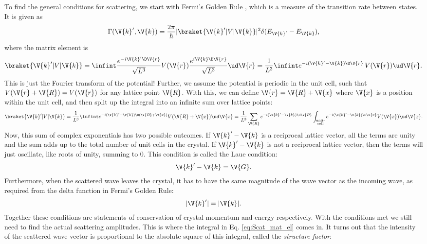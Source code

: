 \documentclass[main.tex]{subfiles}
\begin{document}
	To find the general conditions for scattering, we start with Fermi's Golden Rule \cite{simon}, which is a measure of the transition rate between states. It is given as
	\begin{equation}\label{eq:Scat_fermi}
		\Gamma(\V{k}', \V{k}) = \frac{2\pi}{\hbar}|\braket{\V{k}' | V | \V{k}}|^2 \delta(E_{\V{k}'}-E_{\V{k}}),
	\end{equation}
	where the matrix element is
	\begin{equation}\label{eq:Scat_mat_el_initial}
		\braket{\V{k}' | V | \V{k}} = \infint \frac{e^{-i \V{k}'\D\V{r}}}{\sqrt{L^3}} V(\V{r}) \frac{e^{i \V{k}\D\V{r}}}{\sqrt{L^3}} \ud \V{r} = \frac{1}{L^3} \infint e^{-i(\V{k}'-\V{k}) \D \V{r}} \, V(\V{r}) \ud \V{r}.
	\end{equation}
	This is just the Fourier transform of the potential! Further, we assume the potential is periodic in the unit cell, such that $ V(\V{r} + \V{R}) =  V(\V{r}) $ for any lattice point $ \V{R} $. With this, we can define $ \V{r} = \V{R} + \V{x} $ where $ \V{x} $ is a position within the unit cell, and then split up the integral into an infinite sum over lattice points:
	\begin{equation}\label{eq:Scat_mat_el}
		\braket{\V{k}' | V | \V{k}} = \frac{1}{L^3}\infint e^{-i(\V{k}'-\V{k})\D(\V{R}+\V{x})} V(\V{R}+ \V{x}) \ud \V{x} = \frac{1}{L^3} \sum_{\V{R}} e^{-i(\V{k}'-\V{k}) \D \V{R}}\int_{\substack{\text{unit-} \\\text{cell}}} e^{-i (\V{k}'-\V{k}) \D \V{x}} V(\V{x}) \ud \V{x}.
	\end{equation}
	Now, this sum of complex exponentials has two possible outcomes. If $ \V{k}'-\V{k} $ is a reciprocal lattice vector, all the terms are unity and the sum adds up to the total number of unit cells in the crystal. If $ \V{k}'-\V{k} $ is not a reciprocal lattice vector, then the terms will just oscillate, like roots of unity, summing to 0. This condition is called the Laue condition:
	\begin{equation}\label{eq:Scat_Laue}
		\V{k}' - \V{k} =  \V{G}.
	\end{equation}
	Furthermore, when the scattered wave leaves the crystal, it has to have the same magnitude of the wave vector as the incoming wave, as required from the delta function in Fermi's Golden Rule:
	\begin{equation}\label{eq:Scat_E_cons}
		|\V{k}'| = |\V{k}|.
	\end{equation}
	Together these conditions are statements of conservation of crystal momentum and energy respectively. With the conditions met we still need to find the actual scattering amplitudes. This is where the integral in Eq. \eqref{eq:Scat_mat_el} comes in. It turns out that the intensity of the scattered wave vector is proportional to the absolute square of this integral, called the \textit{structure factor}: \cite{simon}
\end{document}
